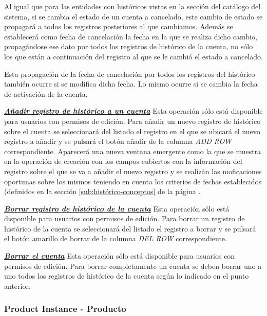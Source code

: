 Al igual que para las entidades con históricos vistas en la sección del catálogo del sistema, si se cambia el estado de un cuenta a cancelado, este cambio de estado se propagará a todos los registros posteriores al que cambiamos. Además se establecerá como fecha de cancelación la fecha en la que se realiza dicho cambio, propagándose ese dato por todos los registros de histórico de la cuenta, no sólo los que están a continuación del registro al que se le cambió el estado a cancelado.

Esta propagación de la fecha de cancelación por todos los registros del histórico  también ocurre si se modifica dicha fecha. Lo mismo ocurre si se cambia la fecha de activación de la cuenta.

\underline{\textsl{\textbf{Añadir registro de histórico a un cuenta}}}\newline
Esta operación sólo está disponible para usuarios con permisos de edición.
Para añadir un nuevo registro de histórico sobre el cuenta se seleccionará del listado el registro en el que se ubicará el nuevo registro a añadir y se pulsará el botón añadir de la columna \textit{ADD ROW} correspondiente. Aparecerá una nueva ventana emergente como la que se muestra en la operación de creación  con los campos cubiertos con la información del registro sobre el que se va a añadir el nuevo registro y se realizán las moficaciones oportunas sobre los mismos teniendo en cuenta los criterios de fechas establecidos (definidos en la sección \ref{sub:histórico-conceptos} de la página \pageref{sub:histórico-conceptos}.


\underline{\textsl{\textbf{Borrar registro de histórico de la cuenta}}}\newline
Esta operación sólo está disponible para usuarios con permisos de edición.
Para borrar un registro de histórico de la cuenta se seleccionará del listado el registro a borrar y se pulsará el botón amarillo de borrar de la columna \textit{DEL ROW} correspondiente.\newline

\underline{\textsl{\textbf{Borrar el cuenta}}}\newline
Esta operación sólo está disponible para usuarios con permisos de edición.
Para borrar completamente un cuenta se deben borrar uno a uno todos los registros de histórico de la cuenta según lo indicado en el punto anterior. 





\subsubsection{Product Instance - Producto}
\label{sub:product}

